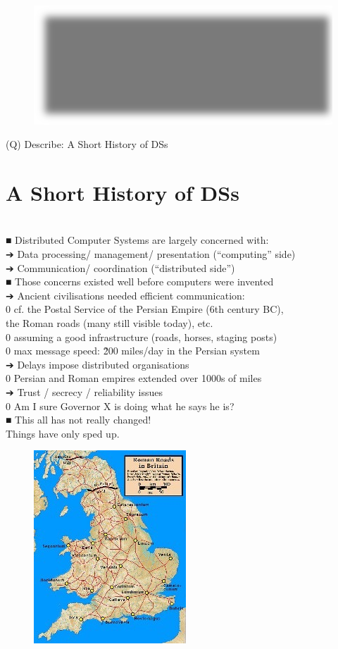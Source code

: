 \documentclass[12pt]{article}
\begin{document}
\begin{figure}[H]
\includegraphics[width=0.5\linewidth]{page12-image-7.png}
\end{figure}
\clearpage
(Q)
Describe: A Short History of DSs
\clearpage
\section{A Short History of DSs}
\\
■ Distributed Computer Systems are largely concerned with:\\
➔ Data processing/ management/ presentation (“computing” side)\\
➔ Communication/ coordination (“distributed side”)\\
■ Those concerns existed well before computers were invented\\
➔ Ancient civilisations needed efficient communication:\\
0 cf. the Postal Service of the Persian Empire (6th century BC), \\
the Roman roads (many still visible today), etc.\\
0 assuming a good infrastructure (roads, horses, staging posts)\\
0 max message speed: \~ 200 miles/day in the Persian system\\
➔ Delays impose distributed organisations\\
0 Persian and Roman empires extended over 1000s of miles\\
➔ Trust / secrecy / reliability issues\\
0 Am I sure Governor X is doing what he says he is?\\
■ This all has not really changed! \\
Things have only sped up.\\
\begin{figure}[H]
\includegraphics[width=0.5\linewidth]{page13-image-1.png}
\end{figure}
\end{document}
